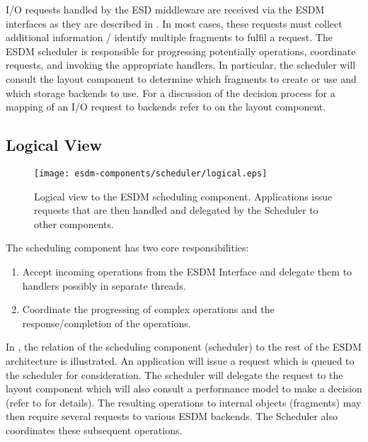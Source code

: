 

I/O requests handled by the ESD middleware are received via the ESDM interfaces as they are described in .
In most cases, these requests must collect additional information / identify multiple fragments to fulfil a request.
The ESDM scheduler is responsible for progressing potentially operations, coordinate requests, and invoking the appropriate handlers.
In particular, the scheduler will consult the layout component to determine which fragments to create or use and which storage backends to use.
For a discussion of the decision process for a mapping of an I/O request to backends refer to  on the layout component.


\subsection{Logical View}

\begin{figure}
	\centering
	\texttt{[image: esdm-components/scheduler/logical.eps]}
	\caption{Logical view to the ESDM scheduling component.
	Applications issue requests that are then handled and delegated by the Scheduler to other components.}
	\label{fig:esdm scheduler logical view}
\end{figure}

The scheduling component has two core responsibilities:

\begin{enumerate}
	\item Accept incoming operations from the ESDM Interface and delegate them to handlers possibly in separate threads.
	\item Coordinate the progressing of complex operations and the response/completion of the operations.
\end{enumerate}

In , the relation of the scheduling component (scheduler) to the rest of the ESDM architecture is illustrated.
An application will issue a request which is queued to the scheduler for consideration.
The scheduler will delegate the request to the layout component which will also consult a performance model to make a decision (refer to  for details).
The resulting operations to internal objects (fragments) may then require several requests to various ESDM backends.
The Scheduler also coordinates these subsequent operations.




